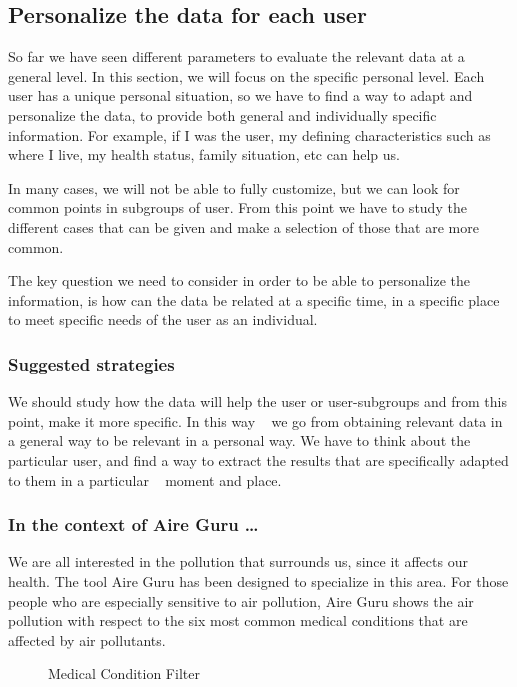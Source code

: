 \subsection{Personalize the data for each user}

So far we have seen different parameters to evaluate the relevant data at a general level. In this section, we will focus on the specific personal level.
Each user has a unique personal situation, so we have to find a way to adapt and personalize the data, to provide both general and individually specific information.
For example, if I was the user, my defining characteristics such as where I live,
my health status, family situation, etc can help us.

In many cases, we will not be able to fully customize, but we can look for common points in subgroups of
user. From this point we have to study the different cases that can be given and make a selection of those that are
more common.

The key question we need to consider in order to be able to personalize the information, is how can the data be related at a specific time, in a specific place to meet specific needs of the
user as an individual.

\subsubsection*{Suggested strategies} 

We should study how the data will help the user or user-subgroups and from this point, make it more specific. In this way
  we go from obtaining relevant data in a general way to be relevant in a personal way. We have to think about the
  particular user, and find a way to extract the results that are specifically adapted to them in a particular
  moment and place.

\subsubsection*{In the context of Aire Guru \ldots}

 We are all interested in the pollution that surrounds us, since it affects our health. The tool
 Aire Guru has been designed to specialize in this area. For those people who are especially sensitive to air pollution, Aire Guru shows the air pollution with respect to the six most common medical conditions that
 are affected by air pollutants.
 
\begin{figure}[ht]
  \centering
  \hfill
  \hfill
  \caption{Medical Condition Filter}
\end{figure}

